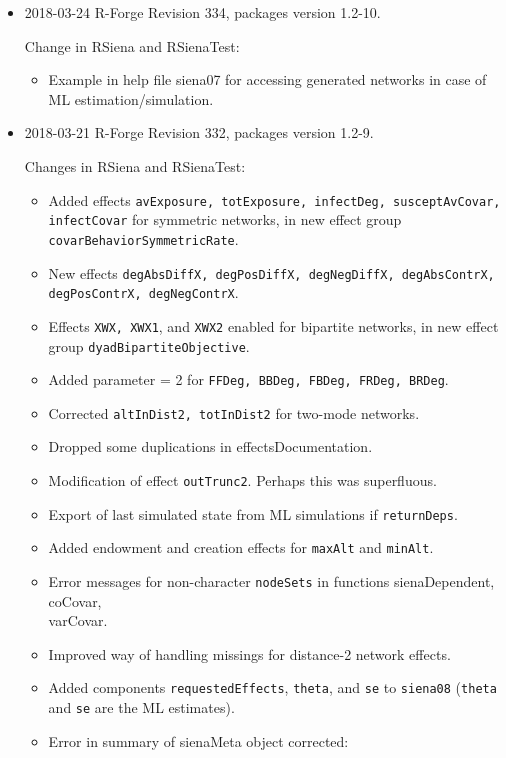 \documentclass[a4paper,fleqn,11pt]{article}
\newcommand{\+}{\, + \,}
\newcommand{\sfn}[1]{\textsf{#1}}
\begin{document}
\begin{small}
\begin{itemize}
\item 2018-03-24 R-Forge Revision 334, packages version 1.2-10.

Change in \textsf{RSiena} and \textsf{RSienaTest}:
\begin{itemize}
   \item Example in help file \textsf{siena07} for accessing generated networks
   in case of ML estimation/simulation.
   \end{itemize}

\item 2018-03-21 R-Forge Revision 332, packages version 1.2-9.

Changes in \textsf{RSiena} and \textsf{RSienaTest}:
\begin{itemize}
   \item Added effects \texttt{avExposure, totExposure, infectDeg,
     susceptAvCovar, infectCovar} for symmetric networks, in
     new effect group \texttt{covarBehaviorSymmetricRate}.
   \item New effects \texttt{degAbsDiffX, degPosDiffX, degNegDiffX, degAbsContrX,
     degPosContrX, degNegContrX}.
   \item Effects \texttt{XWX, XWX1}, and \texttt{XWX2} enabled for
   bipartite networks, in
    new effect group \texttt{dyadBipartiteObjective}.
   \item Added parameter = 2 for \texttt{FFDeg, BBDeg, FBDeg, FRDeg, BRDeg}.
   \item Corrected \texttt{altInDist2, totInDist2} for two-mode networks.
   \item Dropped some duplications in \sfn{effectsDocumentation}.
   \item Modification of effect \texttt{outTrunc2}.
     Perhaps this was superfluous.
   \item Export of last simulated state from ML simulations if
     \texttt{returnDeps}.
   \item Added endowment and creation effects for \texttt{maxAlt} and \texttt{minAlt}.
   \item Error messages for non-character \texttt{nodeSets} in functions
    \sfn{sienaDependent, coCovar,\\ varCovar}.
   \item Improved way of handling missings for distance-2 network effects.
   \item Added components \texttt{requestedEffects}, \texttt{theta}, and
    \texttt{se} to \texttt{siena08}
     (\texttt{theta} and \texttt{se} are the ML estimates).
   \item Error in summary of \sfn{sienaMeta} object corrected:

\end{itemize}
\end{itemize}
\end{small}
\end{document}
